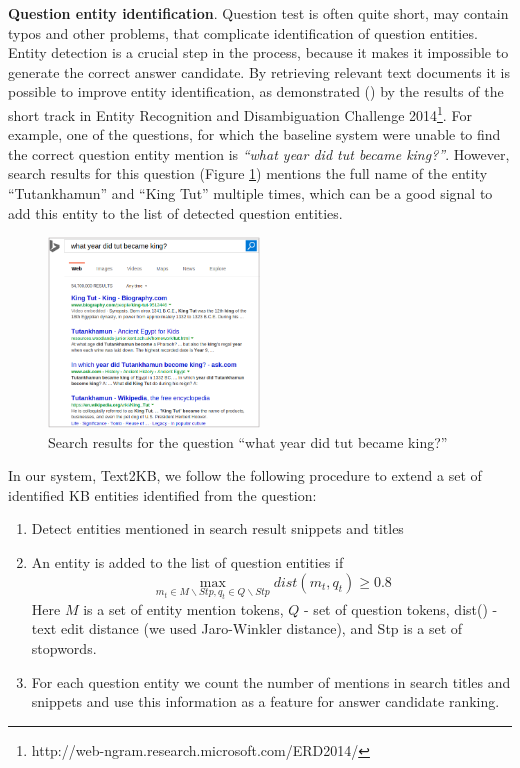 \textbf{Question entity identification}.
Question test is often quite short, may contain typos and other problems, that complicate identification of question entities.
Entity detection is a crucial step in the process, because it makes it impossible to generate the correct answer candidate.
By retrieving relevant text documents it is possible to improve entity identification, as demonstrated (\cite{SMAPH_ERD:2014}) by the results of the short track in Entity Recognition and Disambiguation Challenge 2014\footnote{http://web-ngram.research.microsoft.com/ERD2014/}. 
For example, one of the questions, for which the baseline system were unable to find the correct question entity mention is \emph{``what year did tut became king?''}.
However, search results for this question (Figure \ref{fig:web_search_entitylink}) mentions the full name of the entity ``Tutankhamun'' and ``King Tut'' multiple times, which can be a good signal to add this entity to the list of detected question entities.

\begin{figure}
\centering
\includegraphics[width=0.5\textwidth]{img/web_search_entitylink}
\caption{Search results for the question ``what year did tut became king?''}
\label{fig:web_search_entitylink}
\end{figure}

In our system, Text2KB, we follow the following procedure to extend a set of identified KB entities identified from the question:
\begin{enumerate}
\item Detect entities mentioned in search result snippets and titles
\item An entity is added to the list of question entities if 
$$\max_{m_t \in M\backslash Stp, q_t \in Q\backslash Stp} dist(m_t, q_t) \geq 0.8$$
Here $M$ is a set of entity mention tokens, $Q$ - set of question tokens, dist() - text edit distance (we used Jaro-Winkler distance), and Stp is a set of stopwords.
\item For each question entity we count the number of mentions in search titles and snippets and use this information as a feature for answer candidate ranking.
\end{enumerate}

